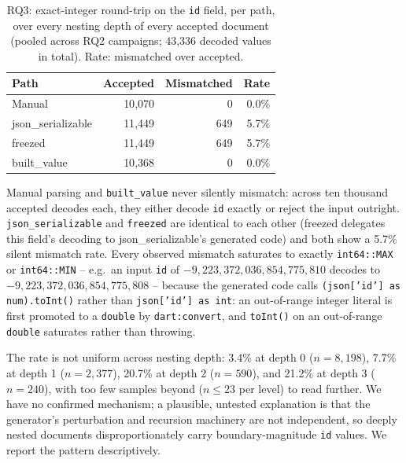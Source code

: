 \begin{table}[t]
\centering
\footnotesize
\caption{RQ3: exact-integer round-trip on the \texttt{id} field, per path, over every nesting depth of every accepted document (pooled across RQ2 campaigns; 43{,}336 decoded values in total). Rate: mismatched over accepted.}
\label{tab:rq3}
\begin{tabular}{@{}lrrr@{}}
\toprule
Path & Accepted & Mismatched & Rate \\
\midrule
Manual & 10{,}070 & 0 & 0.0\% \\
json\_serializable & 11{,}449 & 649 & 5.7\% \\
freezed & 11{,}449 & 649 & 5.7\% \\
built\_value & 10{,}368 & 0 & 0.0\% \\
\bottomrule
\end{tabular}
\end{table}

Manual parsing and \texttt{built\_value} never silently mismatch: across
ten thousand accepted decodes each, they either decode \texttt{id} exactly
or reject the input outright. \texttt{json\_serializable} and
\texttt{freezed} are identical to each other (freezed delegates this
field's decoding to json\_serializable's generated code) and both show a
5.7\% silent mismatch rate. Every observed mismatch saturates to exactly
\texttt{int64::MAX} or \texttt{int64::MIN} -- e.g.\ an input \texttt{id} of
$-9{,}223{,}372{,}036{,}854{,}775{,}810$ decodes to
$-9{,}223{,}372{,}036{,}854{,}775{,}808$ -- because the generated code calls
\texttt{(json['id'] as num).toInt()} rather than \texttt{json['id'] as int}:
an out-of-range integer literal is first promoted to a \texttt{double} by
\texttt{dart:convert}, and \texttt{toInt()} on an out-of-range
\texttt{double} saturates rather than throwing.

The rate is not uniform across nesting depth: 3.4\% at depth 0
($n{=}8{,}198$), 7.7\% at depth 1 ($n{=}2{,}377$), 20.7\% at depth 2
($n{=}590$), and 21.2\% at depth 3 ($n{=}240$), with too few samples beyond
($n \le 23$ per level) to read further. We have no confirmed mechanism; a
plausible, untested explanation is that the generator's perturbation and
recursion machinery are not independent, so deeply nested documents
disproportionately carry boundary-magnitude \texttt{id} values. We report
the pattern descriptively.

